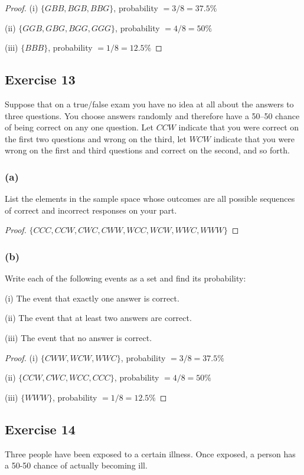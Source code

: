 \documentclass[14pt]{extarticle}
\begin{document}
\begin{proof}
(i) \(\{GBB, BGB, BBG\}\), probability \(= 3/8 = 37.5\%\)

(ii) \(\{GGB, GBG, BGG, GGG\}\), probability \(= 4/8 = 50\%\)

(iii) \(\{BBB\}\), probability \(= 1/8 = 12.5\%\)
\end{proof}

\subsection{Exercise 13}
Suppose that on a true/false exam you have no idea at all about the answers to three questions. You choose answers 
randomly and therefore have a 50–50 chance of being correct on any one question. Let \(CCW\) indicate that you were 
correct on the first two questions and wrong on the third, let \(WCW\) indicate that you were wrong on the first and 
third questions and correct on the second, and so forth.

\subsubsection{(a)}
List the elements in the sample space whose outcomes are all possible sequences of correct and incorrect responses 
on your part.

\begin{proof}
\(\{CCC, CCW, CWC, CWW, WCC, WCW, WWC, WWW\}\)
\end{proof}

\subsubsection{(b)}
Write each of the following events as a set and find its probability:

(i) The event that exactly one answer is correct.

(ii) The event that at least two answers are correct.

(iii) The event that no answer is correct.

\begin{proof}
(i) \(\{CWW, WCW, WWC\}\), probability \(= 3/8 = 37.5\%\)

(ii) \(\{CCW, CWC, WCC, CCC\}\), probability \(= 4/8 = 50\%\)

(iii) \(\{WWW\}\), probability \(= 1/8 = 12.5\%\)
\end{proof}

\subsection{Exercise 14}
Three people have been exposed to a certain illness. Once exposed, a person has a 50-50 chance of actually becoming ill.
\end{document}
